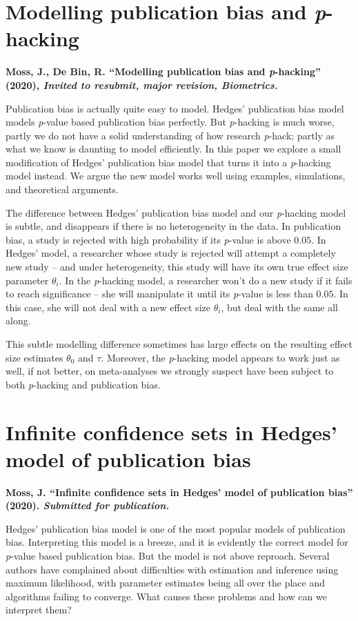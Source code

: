 \section{Modelling publication bias and \emph{p}-hacking}
\textbf{Moss, J., De Bin, R. ``Modelling publication bias and \emph{p}-hacking''
(2020), \emph{Invited to resubmit, major revision, Biometrics.}}

Publication bias is actually quite easy to model. Hedges' publication bias model \parencite{Hedges1992-ue} models \textit{p}-value based publication bias perfectly. But \textit{p}-hacking is much worse, partly we do not have a solid understanding of how research \textit{p}-hack; partly as what we know is daunting to model efficiently. In this paper we explore a small modification of Hedges' publication bias model that turns it into a \textit{p}-hacking model instead. We argue the new model works well using examples, simulations, and theoretical arguments. 

The difference between Hedges' publication bias model and our \textit{p}-hacking model is subtle, and disappears if there is no heterogeneity in the data. In publication bias, a study is rejected with high probability if its \textit{p}-value is above $0.05$. In Hedges' model, a researcher whose study is rejected will attempt a completely new study -- and under heterogeneity, this study will have its own true effect size parameter $\theta_i$. In the \textit{p}-hacking model, a researcher won't do a new study if it fails to reach significance -- she will manipulate it until its \textit{p}-value is less than $0.05$. In this case, she will not deal with a new effect size $\theta_i$, but deal with the same all along.

This subtle modelling difference sometimes has large effects on the resulting effect size estimates $\theta_0$ and $\tau$. Moreover, the \textit{p}-hacking model appears to work just as well, if not better, on meta-analyses we strongly suspect have been subject to both \textit{p}-hacking and publication bias.

\section{Infinite confidence sets in Hedges' model of publication
bias}
\textbf{Moss, J. ``Infinite confidence sets in Hedges' model of publication
bias'' (2020). \emph{Submitted for publication.}}

Hedges' publication bias model is one of the most popular models of publication bias. Interpreting this model is a breeze, and it is evidently the correct model for \textit{p}-value based publication bias. But the model is not above reproach. Several authors have complained about difficulties with estimation and inference using maximum likelihood, with parameter estimates being all over the place and algorithms failing to converge. What causes these problems and how can we interpret them?

